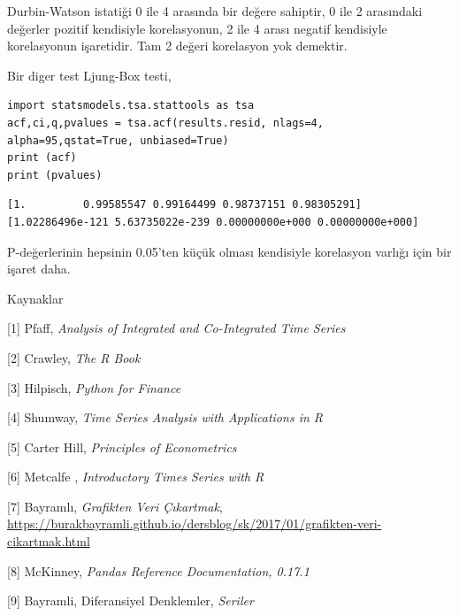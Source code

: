 \documentclass[12pt,fleqn]{article}\usepackage{../../common}
\begin{document}
Durbin-Watson istatiği 0 ile 4 arasında bir değere sahiptir, 0 ile 2 arasındaki
değerler pozitif kendisiyle korelasyonun, 2 ile 4 arası negatif kendisiyle
korelasyonun işaretidir. Tam 2 değeri korelasyon yok demektir.

Bir diger test Ljung-Box testi, 

\begin{verbatim}
import statsmodels.tsa.stattools as tsa
acf,ci,q,pvalues = tsa.acf(results.resid, nlags=4, alpha=95,qstat=True, unbiased=True)
print (acf)
print (pvalues)
\end{verbatim}

\begin{verbatim}
[1.         0.99585547 0.99164499 0.98737151 0.98305291]
[1.02286496e-121 5.63735022e-239 0.00000000e+000 0.00000000e+000]
\end{verbatim}

P-değerlerinin hepsinin 0.05'ten küçük olması kendisiyle korelasyon varlığı
için bir işaret daha.

Kaynaklar

[1] Pfaff, {\em Analysis of Integrated and Co-Integrated Time Series}

[2] Crawley, {\em The R Book}

[3] Hilpisch, {\em Python for Finance}

[4] Shumway, {\em Time Series Analysis with Applications in R}

[5] Carter Hill, {\em Principles of Econometrics}

[6] Metcalfe , {\em Introductory Times Series with R}

[7] Bayramlı, 
    {\em Grafikten Veri Çıkartmak}, 
    \url{https://burakbayramli.github.io/dersblog/sk/2017/01/grafikten-veri-cikartmak.html}

[8] McKinney, {\em Pandas Reference Documentation, 0.17.1}

[9] Bayramli, Diferansiyel Denklemler, {\em Seriler}
\end{document}
